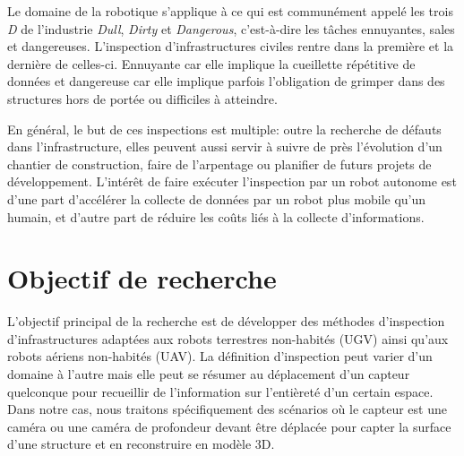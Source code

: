 \label{sec:Introduction}  %
Le domaine de la robotique s'applique à ce qui est communément appelé les trois \emph{D} de l'industrie \emph{Dull}, \emph{Dirty} et \emph{Dangerous}, c'est-à-dire les tâches ennuyantes, sales et dangereuses. L'inspection d'infrastructures civiles rentre dans la première et la dernière de celles-ci. Ennuyante car elle implique la cueillette répétitive de données et dangereuse car elle implique parfois l'obligation de grimper dans des structures hors de portée ou difficiles à atteindre.

En général, le but de ces inspections est multiple: outre la recherche de défauts dans l'infrastructure, elles peuvent aussi servir à suivre de près l'évolution d'un chantier de construction, faire de l'arpentage ou planifier de futurs projets de développement. L'intérêt de faire exécuter l'inspection par un robot autonome est d'une part d'accélérer la collecte de données par un robot plus mobile qu'un humain, et d'autre part de réduire les coûts liés à la collecte d'informations.



\section{Objectif de recherche}

L'objectif principal de la recherche est de développer des méthodes d'inspection d'infrastructures adaptées aux robots terrestres non-habités (UGV) ainsi qu'aux robots aériens non-habités (UAV). La définition d'inspection peut varier d'un domaine à l'autre mais elle peut se résumer au déplacement d'un capteur quelconque pour recueillir de l'information sur l'entièreté d'un certain espace. Dans notre cas, nous traitons spécifiquement des scénarios où le capteur est une caméra ou une caméra de profondeur devant être déplacée pour capter la surface d'une structure et en reconstruire en modèle 3D.


